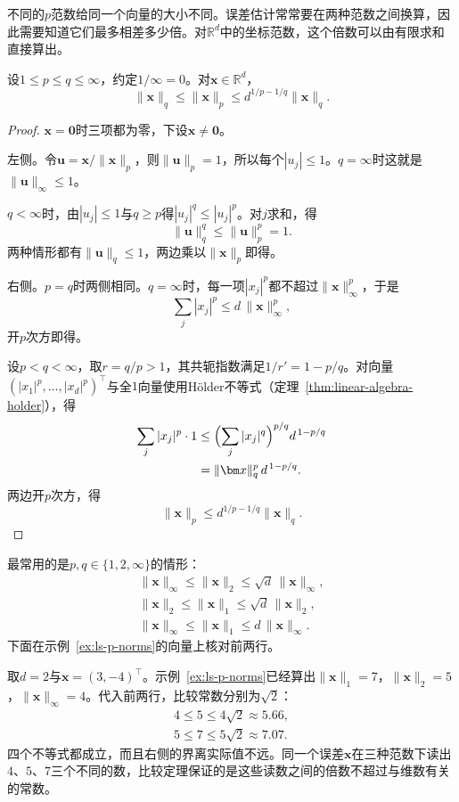 不同的$p$范数给同一个向量的大小不同。误差估计常常要在两种范数之间换算，因此需要知道它们最多相差多少倍。对$\mathbb R^d$中的坐标范数，这个倍数可以由有限求和直接算出。
\begin{theorem}[坐标范数的比较]
\label{thm:ls-coordinate-norm-comparison}
设$1\leq p\leq q\leq\infty$，约定$1/\infty=0$。对$\bm x\in\mathbb R^d$，
\begin{equation}
 \lVert\bm x\rVert_q\leq\lVert\bm x\rVert_p\leq d^{1/p-1/q}\lVert\bm x\rVert_q.
 \label{eq:ls-coordinate-norm-comparison}
\end{equation}
\end{theorem}
\begin{proof}
$\bm x=\bm0$时三项都为零，下设$\bm x\neq\bm0$。

左侧。令$\bm u=\bm x/\lVert\bm x\rVert_p$，则$\lVert\bm u\rVert_p=1$，所以每个$|u_j|\leq1$。$q=\infty$时这就是$\lVert\bm u\rVert_\infty\leq1$。

$q<\infty$时，由$|u_j|\leq1$与$q\geq p$得$|u_j|^q\leq|u_j|^p$。对$j$求和，得
\[
 \lVert\bm u\rVert_q^q\leq\lVert\bm u\rVert_p^p=1.
\]
两种情形都有$\lVert\bm u\rVert_q\leq1$，两边乘以$\lVert\bm x\rVert_p$即得。

右侧。$p=q$时两侧相同。$q=\infty$时，每一项$|x_j|^p$都不超过$\lVert\bm x\rVert_\infty^p$，于是
\[
 \sum_j|x_j|^p\leq d\,\lVert\bm x\rVert_\infty^p,
\]
开$p$次方即得。

设$p<q<\infty$，取$r=q/p>1$，其共轭指数满足$1/r'=1-p/q$。对向量$(|x_1|^p,\ldots,|x_d|^p)^\top$与全$1$向量使用Hölder不等式（定理~\ref{thm:linear-algebra-holder}），得
\[
 \begin{aligned}
 \sum_j|x_j|^p\cdot1
 &\leq\Bigl(\sum_j|x_j|^{q}\Bigr)^{p/q}d^{\,1-p/q}\\
 &=\lVert\bm x\rVert_q^p\,d^{\,1-p/q}.
 \end{aligned}
\]
两边开$p$次方，得
\[
 \lVert\bm x\rVert_p\leq d^{1/p-1/q}\lVert\bm x\rVert_q.
\]
\end{proof}
最常用的是$p,q\in\{1,2,\infty\}$的情形：
\[
 \begin{gathered}
 \lVert\bm x\rVert_\infty\leq\lVert\bm x\rVert_2\leq\sqrt d\,\lVert\bm x\rVert_\infty,\\
 \lVert\bm x\rVert_2\leq\lVert\bm x\rVert_1\leq\sqrt d\,\lVert\bm x\rVert_2,\\
 \lVert\bm x\rVert_\infty\leq\lVert\bm x\rVert_1\leq d\,\lVert\bm x\rVert_\infty.
 \end{gathered}
\]
下面在示例~\ref{ex:ls-p-norms}的向量上核对前两行。
\begin{example}[范数比较的数值核对]
\label{ex:ls-norm-comparison-check}
取$d=2$与$\bm x=(3,-4)^\top$。示例~\ref{ex:ls-p-norms}已经算出$\lVert\bm x\rVert_1=7$，$\lVert\bm x\rVert_2=5$，$\lVert\bm x\rVert_\infty=4$。代入前两行，比较常数分别为$\sqrt2$：
\[
 \begin{gathered}
 4\leq5\leq4\sqrt2\approx5.66,\\
 5\leq7\leq5\sqrt2\approx7.07.
 \end{gathered}
\]
四个不等式都成立，而且右侧的界离实际值不远。同一个误差$\bm x$在三种范数下读出$4$、$5$、$7$三个不同的数，比较定理保证的是这些读数之间的倍数不超过与维数有关的常数。
\end{example}
